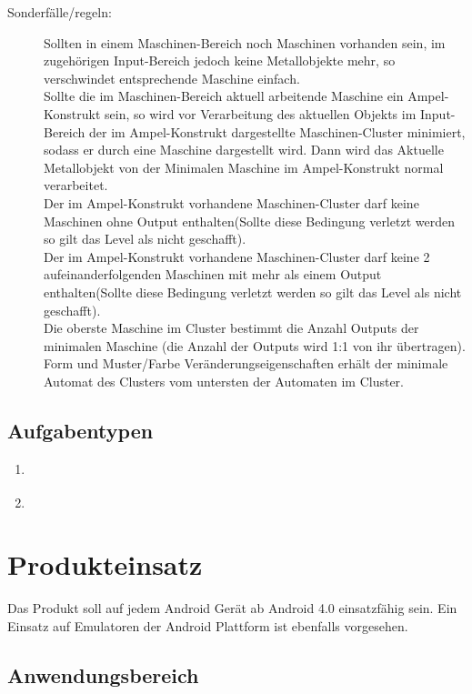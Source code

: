 \documentclass{scrartcl}
\begin{document}
\begin{description}
	\item[Sonderfälle/regeln:] Sollten in einem Maschinen-Bereich noch Maschinen vorhanden sein, im zugehörigen Input-Bereich jedoch keine Metallobjekte mehr, so verschwindet entsprechende Maschine einfach.\\
	Sollte die im Maschinen-Bereich aktuell arbeitende Maschine ein Ampel-Konstrukt sein, so wird vor Verarbeitung des aktuellen Objekts im Input-Bereich der im Ampel-Konstrukt dargestellte Maschinen-Cluster minimiert, sodass er durch eine Maschine dargestellt wird. Dann wird das Aktuelle Metallobjekt von der Minimalen Maschine im Ampel-Konstrukt normal verarbeitet.\\
	Der im Ampel-Konstrukt vorhandene Maschinen-Cluster darf keine Maschinen ohne Output enthalten(Sollte diese Bedingung verletzt werden so gilt das Level als nicht geschafft).\\
	Der im Ampel-Konstrukt vorhandene Maschinen-Cluster darf keine 2 aufeinanderfolgenden Maschinen mit mehr als einem Output enthalten(Sollte diese Bedingung verletzt werden so gilt das Level als nicht geschafft).\\
	Die oberste Maschine im Cluster bestimmt die Anzahl Outputs der minimalen Maschine (die Anzahl der Outputs wird 1:1 von ihr übertragen). Form und Muster/Farbe Veränderungseigenschaften erhält der minimale Automat des Clusters vom untersten der Automaten im Cluster.
\end{description}

\subsection{Aufgabentypen}

\begin{enumerate}
	\item \label{aufgabentyp:puzzle}
	\item \label{aufgabentyp:fehlerfindung}
\end{enumerate}

\clearpage

\section{Produkteinsatz}

Das Produkt soll auf jedem Android Gerät ab Android 4.0 einsatzfähig sein. Ein Einsatz auf Emulatoren der Android Plattform ist ebenfalls vorgesehen.

\subsection{Anwendungsbereich}
\end{document}
